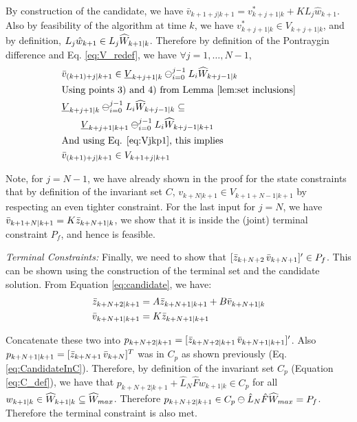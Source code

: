 By construction of the candidate, we have $\bar{v}_{k+1+j|k+1}=v^{*}_{k+j+1|k}+KL_j\hat{w}_{k+1}$. Also by feasibility of the algorithm at time $k$, we have $v^{*}_{k+j+1|k} \in V_{k+j+1|k}$, and by definition, $L_j\hat{w}_{k+1} \in L_j\widehat{W}_{k+1|k}$. Therefore by definition of the Pontraygin difference and Eq. \ref{eq:V_redef}, we have $\forall j=1,\dotsc,N-1$,
\begin{subequations}
\begin{align}
&\bar{v}_{(k+1)+j|k+1} \in \underline{V}_{k+j+1|k} \ominus_{i=0}^{j-1}L_i\widehat{W}_{k+j-1|k} \\
&\text{Using points 3) and 4) from Lemma \ref{lem:set inclusions}} \nonumber \\
&\underline{V}_{k+j+1|k} \ominus_{i=0}^{j-1}L_i\widehat{W}_{k+j-1|k} \subseteq \nonumber \\
& \qquad \underline{V}_{k+j+1|k+1} \ominus_{i=0}^{j-1}L_i\widehat{W}_{k+j-1|k+1} \\
&\text{And using Eq. \ref{eq:Vjkp1}, this implies} \nonumber \\
&\bar{v}_{(k+1)+j|k+1} \in V_{k+1+j|k+1}
\end{align}
\end{subequations}

Note,  for $j=N-1$, we have already shown in the proof for the state constraints that by definition of the invariant set $C$, $v_{k+N|k+1} \in {V}_{k+1+N-1|k+1}$ by respecting an even tighter constraint.
For the last input for $j=N$, we have $\bar{v}_{k+1+N|k+1}=K\bar{z}_{k+N+1|k}$, we show that it is inside the (joint) terminal constraint $P_f$, and hence is feasible.

\textit{Terminal Constraints:} Finally, we need to show that $[\bar{z}_{k+N+2} \, \bar{v}_{k+N+1}]' \in P_f$. This can be shown using the construction of the terminal set and the candidate solution. From Equation \ref{eq:candidate}, we have:
\begin{subequations}
\begin{align}
\bar{z}_{k+N+2|k+1}&=A\bar{z}_{k+N+1|k+1} + B\bar{v}_{k+N+1|k} \\
\bar{v}_{k+N+1|k+1}&=K\bar{z}_{k+N+1|k+1}
\end{align}
\end{subequations}

Concatenate these two into $p_{k+N+2|k+1} = [\bar{z}_{k+N+2|k+1}\, \bar{v}_{k+N+1|k+1}]'$. Also $p_{k+N+1|k+1} = [\bar{z}_{k+N+1} \,\bar{v}_{k+N}]^T$ was in $C_p$ as shown previously (Eq. \ref{eq:CandidateInC}). 
Therefore, by definition of the invariant set $C_p$ (Equation \ref{eq:C_def}), we have that $p_{k+N+2|k+1} + \hat{L}_N \hat{F} w_{k+1|k}\in C_p$ for all $w_{k+1|k}\in \widehat{W}_{k+1|k} \subseteq \widehat{W}_{max}$. 
Therefore $p_{k+N+2|k+1} \in C_p \ominus \hat{L}_N\hat{F}\widehat{W}_{max} = P_f$. 
Therefore the terminal constraint is also met.

